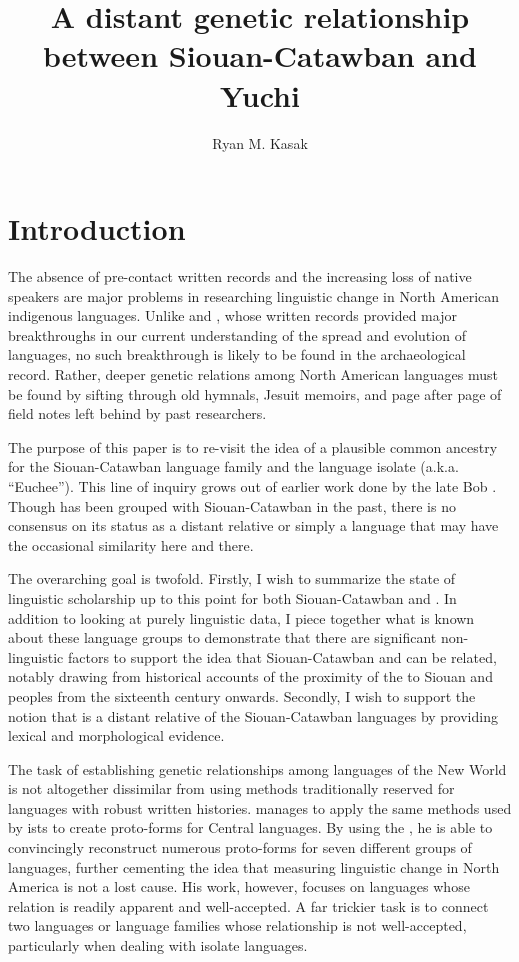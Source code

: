 \documentclass[output=paper]{LSP/langsci}
\author{Ryan M. Kasak}
\title{A distant genetic relationship between {Siouan-Catawban} and {Yuchi}}
\begin{document}
\section{Introduction}\label{sec:kasak:1}

The absence of pre-contact written records and the increasing loss of native speakers are major problems in researching linguistic change in North American indigenous languages. Unlike  and , whose written records provided major breakthroughs in our current understanding of the spread and evolution of  languages, no such breakthrough is likely to be found in the archaeological record. Rather, deeper genetic relations among North American languages must be found by sifting through old hymnals, Jesuit memoirs, and page after page of field notes left behind by past researchers.
 
The purpose of this paper is to re-visit the idea of a plausible common ancestry for the Siouan-Catawban language family and the language isolate  (a.k.a. ``Euchee''). This line of inquiry grows out of earlier work done by the late Bob \citet{Rankin1996,Rankin1998scy}. Though  has been grouped with Siouan-Catawban in the past, there is no consensus on its status as a distant relative or simply a language that may have the occasional similarity here and there.
 
The overarching goal is twofold. Firstly, I wish to summarize the state of linguistic scholarship up to this point for both Siouan-Catawban and . In addition to looking at purely linguistic data, I piece together what is known about these language groups to demonstrate that there are significant non-linguistic factors to support the idea that Siouan-Catawban and  can be related, notably drawing from historical accounts of the proximity of the  to Siouan and  peoples from the sixteenth century onwards. Secondly, I wish to support the notion that  is a distant relative of the Siouan-Catawban languages by providing lexical and morphological evidence.

The task of establishing genetic relationships among languages of the New World is not altogether dissimilar from using methods traditionally reserved for languages with robust written histories. \citet{Bloomfield1925} manages to apply the same methods used by ists to create proto-forms for Central  languages. By using the , he is able to convincingly reconstruct numerous proto-forms for seven different groups of  languages, further cementing the idea that measuring linguistic change in North America is not a lost cause. His work, however, focuses on languages whose relation is readily apparent and well-accepted. A far trickier task is to connect two languages or language families whose relationship is not well-accepted, particularly when dealing with isolate languages. 
\end{document}
